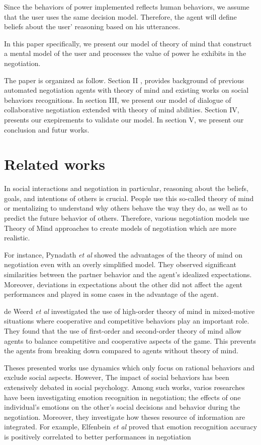 \documentclass[sigconf]{aamas}  %
\begin{document}
	Since the behaviors of power implemented reflects human behaviors, we assume that the user uses the same decision model. Therefore, the agent will define beliefs about the user' reasoning based on his  utterances. 
	
	
	In this paper specifically, we present our model of theory of mind that construct a mental model of the user and processes the value of power he exhibits in the negotiation. 
	
	The paper is organized as follow. Section II , provides background
	of previous automated negotiation agents with theory of mind and existing works on social behaviors recognitions. In section III, we present our model of dialogue of collaborative negotiation extended with theory of mind abilities. Section IV, presents our exepirements to validate our model. In section V, we present our conclusion and futur works.
	
	
	\section{Related works}
	
	In social interactions and negotiation in particular, reasoning about the beliefs, goals, and intentions of others is crucial. People use this so-called theory of mind \cite{premack1978does} or mentalizing to understand why others behave the way they do, as well as to predict the future behavior of others. Therefore, various negotiation models use Theory of Mind approaches to create models of negotiation which are more realistic. 
	
	For instance, Pynadath \textit{et al}\cite{pynadath2013you} showed the advantages of the theory of mind on negotiation even with an overly simplified model. They observed significant similarities between	the partner behavior and the agent's idealized expectations. Moreover, deviations in expectations about the other did not affect the agent performances and played in some cases in the advantage of the agent.
	
	de Weerd \textit{et al} \cite{de2013higher} investigated the use of high-order theory of mind in mixed-motive situations where cooperative and competitive behaviors play an important role. They found that the use of first-order and second-order theory of mind allow agents to balance competitive and cooperative	aspects of the game. This prevents the agents from breaking down compared to  agents without theory of mind.
	
	
	Theses presented works use dynamics which only focus on rational behaviors and exclude social aspects. However, The impact of social behaviors has been extensively debated in social psychology. Among such works, varios researches have been investigating emotion recognition in negotiation; the effects of one individual's	emotions on the other's social decisions and behavior during the negotiation. Moreover, they investigate how theses resource of information are integrated.
	For example, Elfenbein\textit{ et al} \cite{elfenbein2007reading} proved that  emotion recognition accuracy is positively correlated to  better performances in negotiation
	
\end{document}
